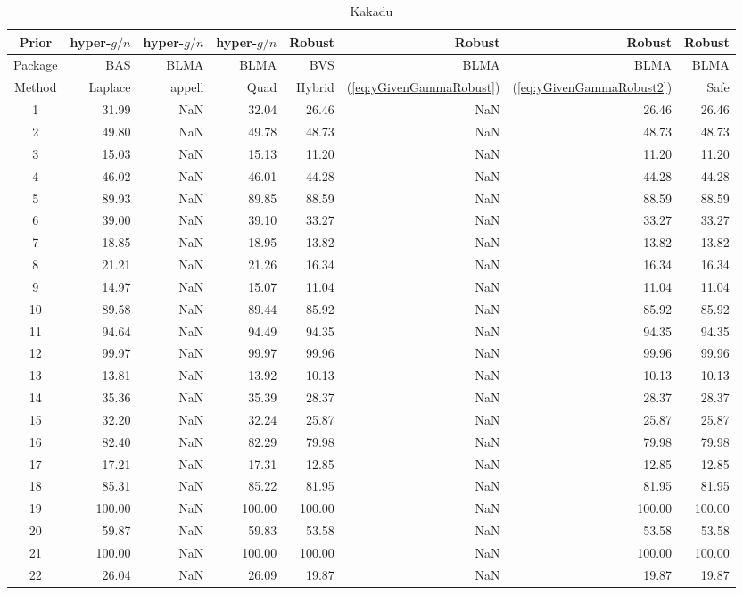 \begin{table}[ht]
	\centering
	{\small 	
	\begin{tabular}{c|rrr|rrrr}
		Prior   & hyper-$g/n$ & hyper-$g/n$ & hyper-$g/n$ & Robust &  Robust & Robust & Robust \\		
		\hline
		Package & BAS         & BLMA        & BLMA        & BVS & BLMA & BLMA & BLMA  \\
		\hline 
		Method  & Laplace     & appell      & Quad  & Hybrid & (\ref{eq:yGivenGammaRobust}) & (\ref{eq:yGivenGammaRobust2}) & Safe \\ 
		\hline
		1 & 31.99 & NaN & 32.04 & 26.46 & NaN & 26.46 & 26.46 \\ 
		2 & 49.80 & NaN & 49.78 & 48.73 & NaN & 48.73 & 48.73 \\ 
		3 & 15.03 & NaN & 15.13 & 11.20 & NaN & 11.20 & 11.20 \\ 
		4 & 46.02 & NaN & 46.01 & 44.28 & NaN & 44.28 & 44.28 \\ 
		5 & 89.93 & NaN & 89.85 & 88.59 & NaN & 88.59 & 88.59 \\ 
		6 & 39.00 & NaN & 39.10 & 33.27 & NaN & 33.27 & 33.27 \\ 
		7 & 18.85 & NaN & 18.95 & 13.82 & NaN & 13.82 & 13.82 \\ 
		8 & 21.21 & NaN & 21.26 & 16.34 & NaN & 16.34 & 16.34 \\ 
		9 & 14.97 & NaN & 15.07 & 11.04 & NaN & 11.04 & 11.04 \\ 
		10 & 89.58 & NaN & 89.44 & 85.92 & NaN & 85.92 & 85.92 \\ 
		11 & 94.64 & NaN & 94.49 & 94.35 & NaN & 94.35 & 94.35 \\ 
		12 & 99.97 & NaN & 99.97 & 99.96 & NaN & 99.96 & 99.96 \\ 
		13 & 13.81 & NaN & 13.92 & 10.13 & NaN & 10.13 & 10.13 \\ 
		14 & 35.36 & NaN & 35.39 & 28.37 & NaN & 28.37 & 28.37 \\ 
		15 & 32.20 & NaN & 32.24 & 25.87 & NaN  & 25.87 & 25.87 \\ 
		16 & 82.40 & NaN & 82.29 & 79.98 & NaN & 79.98 & 79.98 \\ 
		17 & 17.21 & NaN & 17.31 & 12.85 & NaN & 12.85 & 12.85 \\ 
		18 & 85.31 & NaN & 85.22 & 81.95 & NaN & 81.95 & 81.95 \\ 
		19 & 100.00 & NaN & 100.00 & 100.00 & NaN & 100.00 & 100.00 \\ 
		20 & 59.87 & NaN & 59.83 & 53.58 & NaN & 53.58 & 53.58 \\ 
		21 & 100.00 & NaN & 100.00 & 100.00 & NaN  & 100.00 & 100.00 \\ 
		22 & 26.04 & NaN & 26.09 & 19.87 & NaN  & 19.87 & 19.87 \\ 
		\hline
	\end{tabular}
}
	\caption{Kakadu}
	\label{tab:KakaduResults2}
\end{table}



